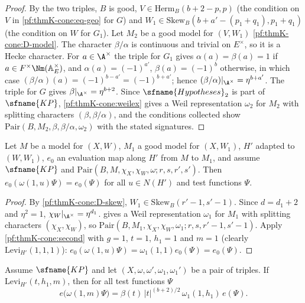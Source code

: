 \begin{proof}
By the two triples, $B$ is good, $V\in\mathrm{Herm}_B(b+2-p,p)$ (the condition on $V$ in \eqref{pf:thmK-cone:eq-geo} for
$G$) and $W_1\in\mathrm{Skew}_B(b+a'-(p_1+q_1),p_1+q_1)$ (the condition on $W$ for $G_1$).  Let $M_2$ be a good model for
$(V,W_1)$ \ref{pf:thmK-cone:D-model}.  The character $\beta/\alpha$ is continuous and trivial on $E^\times$, so it is a
Hecke character.  For $a\in\A^\times$ the triple for $G_1$ gives $\alpha(a)=\beta(a)=1$ if $a\in F^\times\Nm(\thmKconeAE^\times)$,
and $\alpha(a)=(-1)^{a'}$, $\beta(a)=(-1)^b$ otherwise, in which case $(\beta/\alpha)(a)=(-1)^{b-a'}=(-1)^{b+a'}$; hence
$(\beta/\alpha)|_{\A^\times}=\eta^{b+a'}$.  The triple for $G$
gives $\beta|_{\A^\times}=\eta^{b+2}$.  Since $\sfname{Hypotheses}_2$ is part of $\sfname{KP}$, \cref{pf:thmK-cone:weilex} gives
a Weil representation $\omega_2$ for $M_2$ with splitting characters $(\beta,\beta/\alpha)$, and the conditions collected
show $\mathrm{Pair}(B,M_2,\beta,\beta/\alpha,\omega_2)$ with the stated signatures.
\end{proof}

\begin{lemma}\label{pf:thmK-cone:evzeroN}
Let $M$ be a model for $(X,W)$, $M_1$ a good model for $(X,W_1)$, $H'$ adapted to $(W,W_1)$, $e_0$ an evaluation map
along $H'$ from $M$ to $M_1$, and assume $\sfname{KP}$ and $\mathrm{Pair}(B,M,\chi_X,\chi_W,\omega;r,s,r',s')$.  Then
$e_0(\omega(1,u)\Psi)=e_0(\Psi)$ for all $u\in N(H')$ and test functions $\Psi$.
\end{lemma}

\begin{proof}
By \ref{pf:thmK-cone:D-skew}, $W_1\in\mathrm{Skew}_B(r'-1,s'-1)$.  Since $d=d_1+2$ and $\eta^2=1$,
$\chi_W|_{\A^\times}=\eta^{d_1}$.   gives a Weil representation $\omega_1$ for $M_1$ with
splitting characters $(\chi_X,\chi_W)$, so $\mathrm{Pair}(B,M_1,\chi_X,\chi_W,\omega_1;r,s,r'-1,s'-1)$.  Apply
\cref{pf:thmK-cone:second} with $g=1$, $t=1$, $h_1=1$ and $m=1$ (clearly $\mathrm{Levi}_{H'}(1,1,1)$):
$e_0(\omega(1,u)\Psi)=\omega_1(1,1)e_0(\Psi)=e_0(\Psi)$.
\end{proof}

\begin{lemma}\label{pf:thmK-cone:evlaw}
Assume $\sfname{KP}$ and let $(X,\omega,\omega',\omega_1,\omega_1')$ be a pair of triples.  If $\mathrm{Levi}_{H'}(t,h_1,m)$,
then for all test functions $\Psi$
\[
  e\bigl(\omega(1,m)\Psi\bigr)=\beta(t)\,|t|^{(b+2)/2}\,\omega_1(1,h_1)\,e(\Psi).
\]
\end{lemma}

